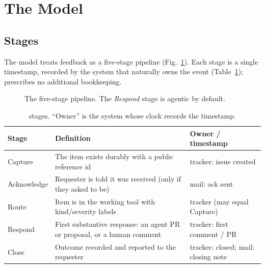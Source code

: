 \section{The \ffrs{} Model}\label{sec:model}
\subsection{Stages}
The \ffrs{} model treats feedback as a five-stage pipeline (Fig.~\ref{fig:pipeline}). Each stage is a single timestamp, recorded by the system that naturally owns the event (Table~\ref{tab:stages}); \ffrs{} prescribes no additional bookkeeping.

\begin{figure}[h]
\centering
{}
\vspace{-2mm}
\caption{The five-stage \ffrs{} pipeline. The \emph{Respond} stage is agentic by default.}
\label{fig:pipeline}
\end{figure}

\begin{table}[t]
\centering\footnotesize
\caption{\ffrs{} stages. ``Owner'' is the system whose clock records the timestamp.}
\label{tab:stages}
\begin{tabular}{@{}l>{\raggedright\arraybackslash}p{3.6cm}>{\raggedright\arraybackslash}p{2.6cm}@{}}
\toprule
Stage & Definition & Owner / timestamp \\
\midrule
Capture & The item exists durably with a public reference id & tracker: issue created \\
Acknowledge & Requester is told it was received (only if they asked to be) & mail: ack sent \\
Route & Item is in the working tool with kind/severity labels & tracker (may equal Capture) \\
Respond & First substantive response: an agent PR or proposal, or a human comment & tracker: first comment / PR \\
Close & Outcome recorded and reported to the requester & tracker: closed; mail: closing note \\
\bottomrule
\end{tabular}
\end{table}

